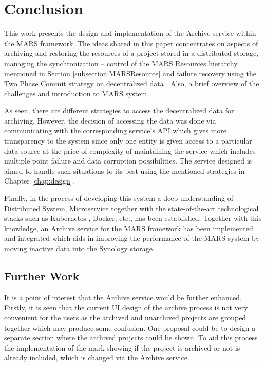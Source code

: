 \chapter{Conclusion}
This work presents the design and implementation of the Archive service within the MARS framework. The ideas shared
in this paper concentrates on aspects of archiving and restoring the resources of a project stored in a distributed storage, managing the synchronization
-- control of the MARS Resources hierarchy mentioned in Section \ref{subsection:MARSResource} and failure recovery using the Two Phase Commit strategy
on decentralized data \cite{atomic}.
Also, a brief overview of the challenges and introduction to MARS system.

As seen, there are different strategies to access the decentralized data for archiving. However, the decision of accessing the data was done via communicating
with the corresponding service's API which gives more transparency to the system since only one entity is given access to a particular data source at the price of 
complexity of maintaining the service which includes multiple point failure and data corruption possibilities. The service designed is aimed to handle such situations
to its best using the mentioned strategies in Chapter \ref{chap:design}.

Finally, in the process of developing this system a deep understanding of Distributed System, Microservice together with the state-of-the-art technological stacks
such as Kubernetes \cite{kubernetes}, Docker, etc., has been established. Together with this knowledge, an Archive service for the MARS framework has been implemented and integrated 
which aids in improving the performance of the MARS system by moving inactive data into the Synology storage.

\section{Further Work}
It is a point of interest that the Archive service would be further enhanced. Firstly, it is seen that the current UI design of the archive process is not very convenient
for the users as the archived and unarchived projects are grouped together which may produce some confusion. One proposal could be to design a separate section
where the archived projects could be shown. To aid this process the implementation of the mark showing if the project is archived or not is already included, which is
changed via the Archive service. 


